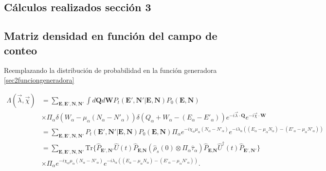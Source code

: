 \begin{appendixs}
	
	\section{Cálculos realizados sección 3}

	\subsection{Matriz densidad en función del campo de conteo}
    \label{apendix:fcs1}
    Reemplazando la distribución de probabilidad en la función generadora \ref{sec2funciongeneradora}

    \begin{align*}
        \Lambda(\vec{\lambda},\vec{\chi}) & = \sum_{\textbf{E},\textbf{E}',\textbf{N},\textbf{N}'} \int d\textbf{Q}d\textbf{W} P_{t}(\textbf{E}',\textbf{N}'|\textbf{E},\textbf{N}) P_{0}(\textbf{E},\textbf{N})  \\
        & \times \Pi_{\alpha} \delta(W_{\alpha} - \mu_{\alpha}(N_{\alpha} - N'_{\alpha}) ) \delta(Q_{\alpha} + W_{\alpha} -(E_{\alpha} - E'_{\alpha})) e^{-i\vec{\lambda}\cdot \textbf{Q}} e^{-i\vec{\chi}\cdot \textbf{W}} \\
        & = \sum_{\textbf{E},\textbf{E}',\textbf{N},\textbf{N}'}P_{t}(\textbf{E}',\textbf{N}'|\textbf{E},\textbf{N})P_{0}(\textbf{E},\textbf{N}) \Pi_{\alpha}e^{-i\chi_{\alpha}\mu_{\alpha}(N_{\alpha} - N'_{\alpha})}e^{-i\lambda_{\alpha}((E_{\alpha} -\mu_{\alpha}N_{\alpha}) - (E'_{\alpha} - \mu_{\alpha}N'_{\alpha}) ) }  \\
        & = \sum_{\textbf{E},\textbf{E}',\textbf{N},\textbf{N}'} \text{Tr}\{\hat{P}_{\textbf{E}',\textbf{N}'}\hat{U}(t)\hat{P}_{\textbf{E},\textbf{N}}(\hat{\rho}_{s}(0) \otimes \Pi_{\alpha}\hat{\tau}_{\alpha} )\hat{P}_{\textbf{E},\textbf{N}}\hat{U}^{\dagger}(t)\hat{P}_{\textbf{E}',\textbf{N}'}   \} \\
        & \times \Pi_{\alpha} e^{-i\chi_{\alpha}\mu_{\alpha}(N_{\alpha} - N'_{\alpha})}e^{-i\lambda_{\alpha}((E_{\alpha} -\mu_{\alpha}N_{\alpha}) - (E'_{\alpha} - \mu_{\alpha}N'_{\alpha}) ) }.
    \end{align*}


\end{appendixs}
